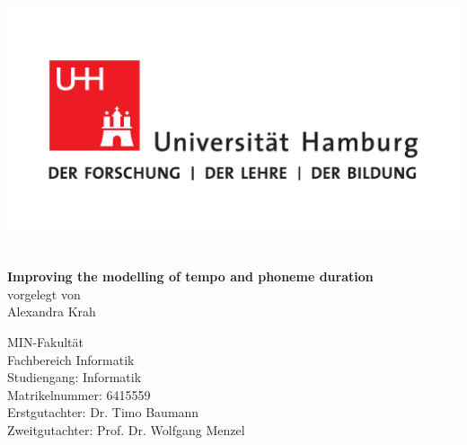 \documentclass[11pt,a4paper]{scrbook}
\begin{document}
\frontmatter
{}
\begin{titlepage}
\includegraphics[scale=0.3]{../Graphen/UHH-Logo_2010_Farbe_CMYK.pdf}
\vspace*{2cm}
\Large
\begin{center} 
      {\color{uhhred}\textbf{}}
\vspace*{2.0cm}\\
{\LARGE \textbf{Improving the modelling of tempo and phoneme duration}}
\vspace*{2.0cm}\\
vorgelegt von
\vspace*{0.4cm}\\
Alexandra Krah
\end{center}
\vspace*{3.9cm}

\noindent 
MIN-Fakultät \vspace*{0.4cm} \\ 
Fachbereich Informatik \vspace*{0.4cm} \\ 
Studiengang: Informatik \vspace*{0.4cm} \\ 
Matrikelnummer: 6415559 \vspace*{0.8cm} \\ 
Erstgutachter: Dr. Timo Baumann \vspace*{0.4cm} \\ 
Zweitgutachter: Prof. Dr. Wolfgang Menzel

\end{titlepage}

\restoregeometry
\end{document}
